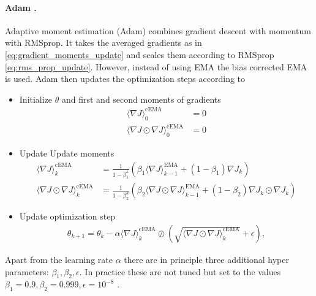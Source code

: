 \documentclass[12pt,a4paper]{article}
\begin{document}
\paragraph{Adam \cite{AdamOptimizer2014}.} Adaptive moment estimation (Adam) combines gradient descent with momentum with RMSprop. It takes the averaged gradients as in \ref{eq:gradient_moments_update} and scales them according to RMSprop \ref{eq:rms_prop_update}. However, instead of using EMA the bias corrected EMA is used. Adam then updates the optimization steps according to
\begin{itemize}	\setlength\itemsep{0em}
	\item Initialize $\theta$ and first and second moments of gradients
	\begin{align*}
	\langle  \nabla J \rangle ^{\text{cEMA}}_0 &= 0   \\ 
	\langle \nabla J  \odot \nabla J\rangle ^{\text{cEMA}}_0 &= 0  
	\end{align*}
	\item Update Update moments
	\begin{align*}
	\langle  \nabla J \rangle ^{\text{cEMA}}_k &= \frac{1}{1-\beta_1^k}\left( \beta_1 \langle  \nabla J \rangle ^{\text{EMA}}_{k-1}+ (1-\beta_1) \nabla J_k \right)\\
	\langle \nabla J  \odot \nabla J\rangle^{\text{cEMA}}_k &= \frac{1}{1-\beta_2^k}\left( \beta_2 \langle \nabla J  \odot \nabla J\rangle^{\text{EMA}}_{k -1} + (1-\beta_2) \nabla J_k  \odot \nabla J_k\right) 
	\end{align*}
	\item Update optimization step
	\begin{align}
	\theta_{k+1} = \theta_k - \alpha \langle  \nabla J \rangle ^{\text{cEMA}}_k \oslash \left(\sqrt{\langle \nabla J  \odot \nabla J\rangle^{\text{cEMA}}_k} + \epsilon \right), \label{eq:adam_update} 
	\end{align}
\end{itemize}
Apart from the learning rate $\alpha$ there are in principle three additional hyper parameters: $\beta_1, \beta_2, \epsilon$. In practice these are not tuned but set to the values $\beta_1 = 0.9, \beta_2=0.999, \epsilon=10^{-8}$ \cite{AdamOptimizer2014}.
\end{document}
